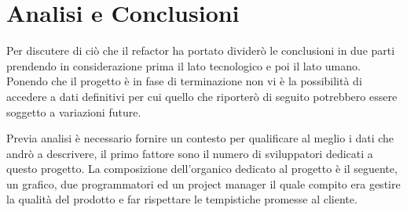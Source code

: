 \chapter{Analisi e Conclusioni}
\label{cha:intro}
\vspace{5mm}

Per discutere di ciò che il refactor ha portato dividerò le conclusioni in due parti prendendo in considerazione prima il lato tecnologico e poi il lato umano. Ponendo che il progetto è in fase di terminazione non vi è la possibilità di accedere a dati definitivi per cui quello che riporterò di seguito potrebbero essere soggetto a variazioni future.

\vspace{5mm} Previa analisi è necessario fornire un contesto per qualificare al meglio i dati che andrò a descrivere, il primo fattore sono il numero di sviluppatori dedicati a questo progetto. La composizione dell'organico dedicato al progetto è il seguente, un grafico, due programmatori ed un project manager il quale compito era gestire la qualità del prodotto e far rispettare le tempistiche promesse al cliente.
\vspace{5mm}


